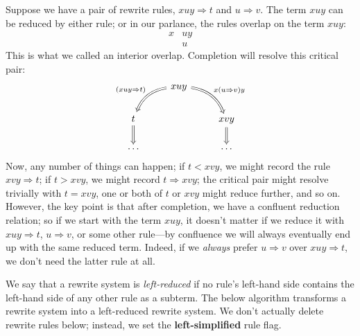 \documentclass[../generics]{subfiles}
\begin{document}
Suppose we have a pair of rewrite rules, $xuy\Rightarrow t$ and $u\Rightarrow v$. The term $xuy$ can be reduced by either rule; or in our parlance, the rules overlap on the term $xuy$:
\begin{align*}
x&uy\\
&u
\end{align*}
This is what we called an interior overlap. Completion will resolve this critical pair:
\[
\begin{tikzcd}
&xuy
\arrow[ld, Rightarrow, bend right, "(xuy\Rightarrow t)"']
\arrow[rd, Rightarrow, bend left, "x(u\Rightarrow v)y"]
\\
t\arrow[d, Rightarrow]&&xvy\arrow[d, Rightarrow]\\
\ldots&&\ldots
\end{tikzcd}
\]
Now, any number of things can happen; if $t<xvy$, we might record the rule $xvy\Rightarrow t$; if $t>xvy$, we might record $t\Rightarrow xvy$; the critical pair might resolve trivially with $t=xvy$, one or both of $t$ or $xvy$ might reduce further, and so on. However, the key point is that after completion, we have a confluent reduction relation; so if we start with the term $xuy$, it doesn't matter if we reduce it with $xuy\Rightarrow t$, $u\Rightarrow v$, or some other rule---by confluence we will always eventually end up with the same reduced term. Indeed, if we \emph{always} prefer $u\Rightarrow v$ over $xuy\Rightarrow t$, we don't need the latter rule at all.

We say that a rewrite system is \emph{left-reduced} if no rule's left-hand side contains the left-hand side of any other rule as a subterm. The below algorithm transforms a rewrite system into a left-reduced rewrite system. We don't actually delete rewrite rules below; instead, we set the \textbf{left-simplified} rule flag.
\end{document}
